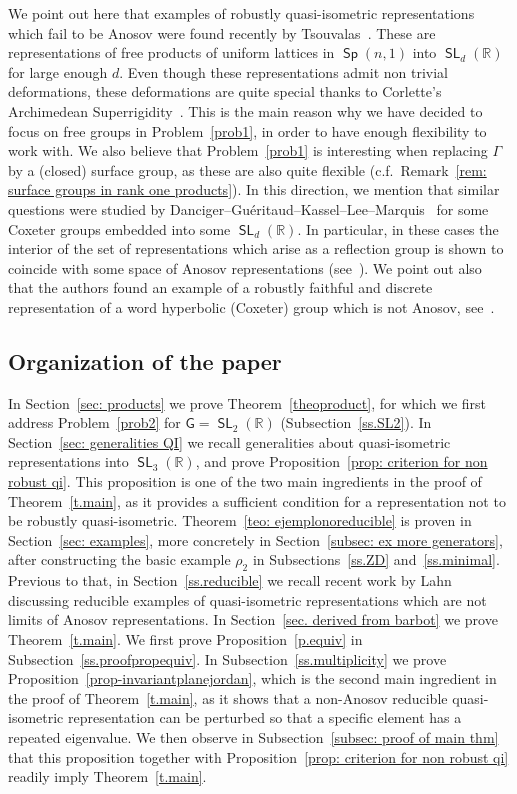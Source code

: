 \documentclass[AHL,Unicode,longabstracts]{cedram}
\DeclareMathOperator{\SL}{\mathsf{SL}}
\DeclareMathOperator{\Sp}{\mathsf{Sp}}
\newcommand{\R}{\mathbb{R}}
\newcommand{\sG}{\mathsf{G}}
\begin{document}
We point out here that examples of robustly quasi-isometric representations which fail to be Anosov were found recently by Tsouvalas~\cite{tsouvalas2}. These are representations of free products of uniform lattices in $\Sp(n,1)$ into $\SL_d(\R)$ for large enough $d$. Even though these representations admit non trivial deformations, these deformations are quite special thanks to Corlette's Archimedean Superrigidity~\cite{corlette}. This is the main reason why we have decided to focus on free groups in Problem~\ref{prob1}, in order to have enough flexibility to work with. We also believe that Problem~\ref{prob1} is interesting when replacing $\Gamma$ by a (closed) surface group, as these are also quite flexible (c.f.~Remark~\ref{rem: surface groups in rank one products}). In this direction, we mention that similar questions were studied by Danciger--Guéritaud--Kassel--Lee--Marquis~\cite{DGKLMconvexcoxeter} for some Coxeter groups embedded into some $\SL_d(\R)$. In particular, in these cases the interior of the set of representations which arise as a reflection group is shown to coincide with some space of Anosov representations (see~\cite[Corollary~1.18]{DGKLMconvexcoxeter}). We point out also that the authors found an example of a robustly faithful and discrete representation of a word hyperbolic (Coxeter) group which is not Anosov, see~\cite[Remark~1.19]{DGKLMconvexcoxeter}.



\subsection{Organization of the paper}


In Section~\ref{sec: products} we prove Theorem~\ref{theoproduct}, for which we first address Problem~\ref{prob2} for $\sG=\SL_2(\R)$ (Subsection~\ref{ss.SL2}). In Section~\ref{sec: generalities QI} we recall generalities about quasi-isometric representations into $\SL_3(\R)$, and prove Proposition~\ref{prop: criterion for non robust qi}. This proposition is one of the two main ingredients in the proof of Theorem~\ref{t.main}, as it provides a sufficient condition for a representation not to be robustly quasi-isometric. Theorem~\ref{teo: ejemplonoreducible} is proven in Section~\ref{sec: examples}, more concretely in Section~\ref{subsec: ex more generators}, after constructing the basic example $\rho_2$ in Subsections~\ref{ss.ZD} and~\ref{ss.minimal}. Previous to that, in Section~\ref{ss.reducible} we recall recent work by Lahn~\cite{lahn} discussing reducible examples of quasi-isometric representations which are not limits of Anosov representations. In Section~\ref{sec. derived from barbot} we prove Theorem~\ref{t.main}. We first prove Proposition~\ref{p.equiv} in Subsection~\ref{ss.proofpropequiv}. In Subsection~\ref{ss.multiplicity} we prove Proposition~\ref{prop-invariantplanejordan}, which is the second main ingredient in the proof of Theorem~\ref{t.main}, as it shows that a non-Anosov reducible quasi-isometric representation can be perturbed so that a specific element has a repeated eigenvalue. We then observe in Subsection~\ref{subsec: proof of main thm} that this proposition together with Proposition~\ref{prop: criterion for non robust qi} readily imply Theorem~\ref{t.main}.
\end{document}
